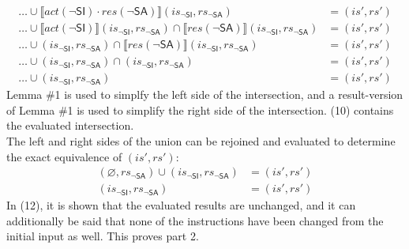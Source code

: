 \documentclass[12pt, letterpaper]{article}
\let\emptyset\varnothing
\begin{document}
\begin{align}
    \ldots \cup %
    \llbracket \mathit{act}(\neg\mathsf{SI}) \cdot
     \mathit{res}(\neg\mathsf{SA}) \rrbracket (\mathit{is_{\mathsf{\neg SI}}}, \mathit{rs_{\mathsf{\neg SA}}})
    &=
    (\mathit{is}', \mathit{rs}')
    \\
    \ldots \cup %
    \llbracket \mathit{act}(\neg\mathsf{SI}) \rrbracket (\mathit{is_{\mathsf{\neg SI}}}, \mathit{rs_{\mathsf{\neg SA}}}) \cap
    \llbracket \mathit{res}(\neg\mathsf{SA}) \rrbracket (\mathit{is_{\mathsf{\neg SI}}}, \mathit{rs_{\mathsf{\neg SA}}})
    &=
    (\mathit{is}', \mathit{rs}')
    \\
    \ldots \cup %
    (\mathit{is_{\mathsf{\neg SI}}}, \mathit{rs_{\mathsf{\neg SA}}}) \cap
    \llbracket \mathit{res}(\neg\mathsf{SA}) \rrbracket (\mathit{is_{\mathsf{\neg SI}}}, \mathit{rs_{\mathsf{\neg SA}}})
    &=
    (\mathit{is}', \mathit{rs}')
    \\
    \ldots \cup %
    (\mathit{is_{\mathsf{\neg SI}}}, \mathit{rs_{\mathsf{\neg SA}}}) \cap
    (\mathit{is_{\mathsf{\neg SI}}}, \mathit{rs_{\mathsf{\neg SA}}})
    &=
    (\mathit{is}', \mathit{rs}')
    \\
    \ldots \cup %
    (\mathit{is_{\mathsf{\neg SI}}}, \mathit{rs_{\mathsf{\neg SA}}})
    &=
    (\mathit{is}', \mathit{rs}')
\end{align}
    Lemma \#1 is used to simplfy the left side of the intersection, and a result-version of Lemma \#1 is used to simplify the right side of the intersection. (10) contains the evaluated intersection.\\
    The left and right sides of the union can be rejoined and evaluated to determine the exact equivalence of $(\mathit{is}', \mathit{rs}')$:
\begin{align}
    (\emptyset, \mathit{rs_{\mathsf{\neg SA}}}) \cup
    (\mathit{is_{\mathsf{\neg SI}}}, \mathit{rs_{\mathsf{\neg SA}}})
    &=
    (\mathit{is}', \mathit{rs}')
    \\
    (\mathit{is_{\mathsf{\neg SI}}}, \mathit{rs_{\mathsf{\neg SA}}})
    &=
    (\mathit{is}', \mathit{rs}')
\end{align}
    In (12), it is shown that the evaluated results are unchanged, and it can additionally be said that none of the instructions have been changed from the initial input as well.  This proves part 2.


\end{document}
